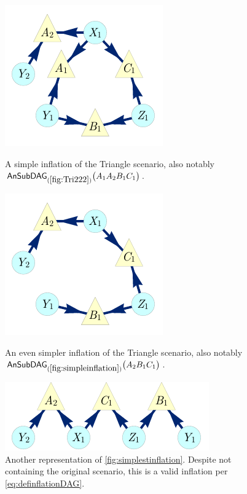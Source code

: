 \begin{figure}[hb]
\centering
\begin{minipage}[t]{0.3\linewidth}
\centering
\includegraphics[scale=1]{broadcastingexamplenohighlight.pdf}
\caption{A simple inflation of the Triangle scenario, also notably $\ansubgraph[(\cref{fig:Tri222})]{A_1 A_2 B_1 C_1}$.}\label{fig:simpleinflation}
\end{minipage}\hfill
\begin{minipage}[t]{0.275\linewidth}
\centering
\includegraphics[scale=1]{nobroadcastingexamplenohighlight.pdf}
\caption{An even simpler inflation of the Triangle scenario, also notably $\ansubgraph[(\cref{fig:simpleinflation})]{A_2 B_1 C_1}$. }\label{fig:simplestinflation}
\end{minipage}
\hfill
\begin{minipage}[t]{0.325\linewidth}
\centering
\includegraphics[scale=1]{TriDagSubA2B1C1.pdf}
\caption{Another representation of \cref{fig:simplestinflation}. Despite not containing the original scenario, this is a valid inflation per \cref{eq:definflationDAG}.}\label{fig:TriDagSubA2B1C1}
\end{minipage}
\end{figure}

